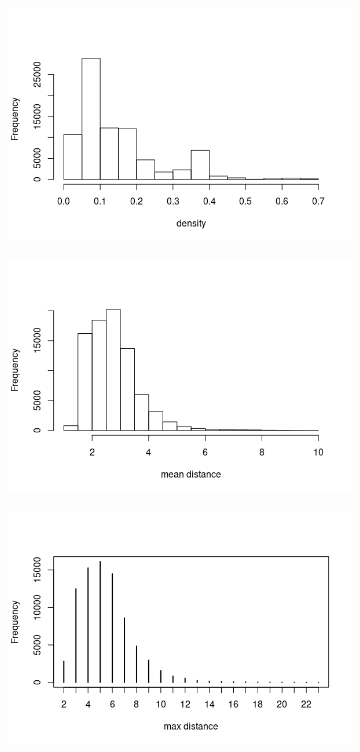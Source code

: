 \documentclass{article}
\theoremstyle{definition}
\theoremstyle{remark}
\begin{document}
\begin{figure}
\begin{subfigure}[t]{0.49\textwidth}
  \end{subfigure}
  \begin{subfigure}[t]{0.49\textwidth}
    \centering
    \includegraphics[width=\textwidth]{mcs_density.png}
  \end{subfigure}
  \begin{subfigure}[t]{0.49\textwidth}
    \centering
    \includegraphics[width=\textwidth]{mcs_meandist.png}
  \end{subfigure}
  \begin{subfigure}[t]{0.49\textwidth}
    \centering
    \includegraphics[width=\textwidth]{mcs_maxdist.png}

\end{subfigure}
\end{figure}
\end{document}
